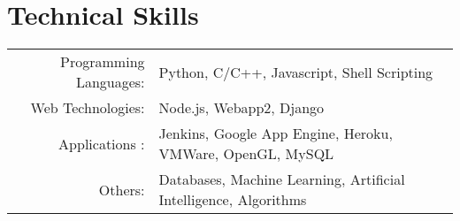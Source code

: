 \section{Technical Skills}
\renewcommand{\arraystretch}{1}%
\begin{tabular}{rl}

Programming Languages: &  Python, C/C++, Javascript, Shell Scripting\\
Web Technologies: & Node.js, Webapp2,  Django\\
Applications : & Jenkins, Google App Engine, Heroku, VMWare, OpenGL, MySQL\\
Others: & Databases, Machine Learning, Artificial Intelligence, Algorithms \\
\end{tabular}
\vspace{5pt}

